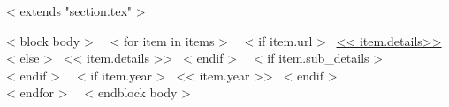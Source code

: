 ~< extends "section.tex" >~

~< block body >~
  ~< for item in items >~
    ~< if item.url >~
      \href{<< item.url >>}{<< item.details>>}
    ~< else >~
      << item.details >>
    ~< endif >~
    ~< if item.sub_details >~
      \,\, {\scriptsize
        \color{gray}{<< item.sub_details >>}
      } \\[2mm]
    ~< endif >~
    ~< if item.year >~
        \hfill << item.year >>
    ~< endif >~
        \\
  ~< endfor >~
~< endblock body >~